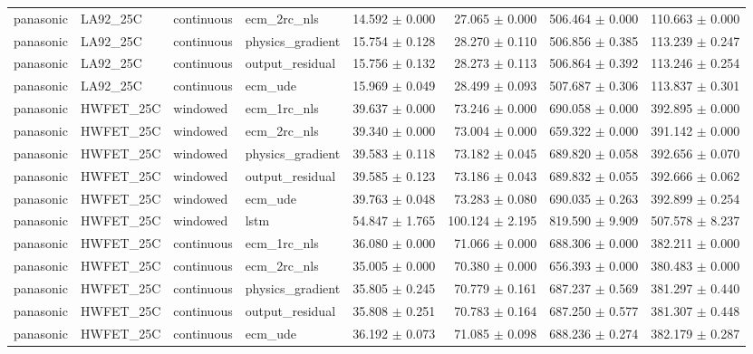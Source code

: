 \begin{longtable}{llllrrrr}
panasonic & LA92\_25C & continuous & ecm\_2rc\_nls & 14.592 $\pm$ 0.000 & 27.065 $\pm$ 0.000 & 506.464 $\pm$ 0.000 & 110.663 $\pm$ 0.000 \\
panasonic & LA92\_25C & continuous & physics\_gradient & 15.754 $\pm$ 0.128 & 28.270 $\pm$ 0.110 & 506.856 $\pm$ 0.385 & 113.239 $\pm$ 0.247 \\
panasonic & LA92\_25C & continuous & output\_residual & 15.756 $\pm$ 0.132 & 28.273 $\pm$ 0.113 & 506.864 $\pm$ 0.392 & 113.246 $\pm$ 0.254 \\
panasonic & LA92\_25C & continuous & ecm\_ude & 15.969 $\pm$ 0.049 & 28.499 $\pm$ 0.093 & 507.687 $\pm$ 0.306 & 113.837 $\pm$ 0.301 \\
panasonic & HWFET\_25C & windowed & ecm\_1rc\_nls & 39.637 $\pm$ 0.000 & 73.246 $\pm$ 0.000 & 690.058 $\pm$ 0.000 & 392.895 $\pm$ 0.000 \\
panasonic & HWFET\_25C & windowed & ecm\_2rc\_nls & 39.340 $\pm$ 0.000 & 73.004 $\pm$ 0.000 & 659.322 $\pm$ 0.000 & 391.142 $\pm$ 0.000 \\
panasonic & HWFET\_25C & windowed & physics\_gradient & 39.583 $\pm$ 0.118 & 73.182 $\pm$ 0.045 & 689.820 $\pm$ 0.058 & 392.656 $\pm$ 0.070 \\
panasonic & HWFET\_25C & windowed & output\_residual & 39.585 $\pm$ 0.123 & 73.186 $\pm$ 0.043 & 689.832 $\pm$ 0.055 & 392.666 $\pm$ 0.062 \\
panasonic & HWFET\_25C & windowed & ecm\_ude & 39.763 $\pm$ 0.048 & 73.283 $\pm$ 0.080 & 690.035 $\pm$ 0.263 & 392.899 $\pm$ 0.254 \\
panasonic & HWFET\_25C & windowed & lstm & 54.847 $\pm$ 1.765 & 100.124 $\pm$ 2.195 & 819.590 $\pm$ 9.909 & 507.578 $\pm$ 8.237 \\
panasonic & HWFET\_25C & continuous & ecm\_1rc\_nls & 36.080 $\pm$ 0.000 & 71.066 $\pm$ 0.000 & 688.306 $\pm$ 0.000 & 382.211 $\pm$ 0.000 \\
panasonic & HWFET\_25C & continuous & ecm\_2rc\_nls & 35.005 $\pm$ 0.000 & 70.380 $\pm$ 0.000 & 656.393 $\pm$ 0.000 & 380.483 $\pm$ 0.000 \\
panasonic & HWFET\_25C & continuous & physics\_gradient & 35.805 $\pm$ 0.245 & 70.779 $\pm$ 0.161 & 687.237 $\pm$ 0.569 & 381.297 $\pm$ 0.440 \\
panasonic & HWFET\_25C & continuous & output\_residual & 35.808 $\pm$ 0.251 & 70.783 $\pm$ 0.164 & 687.250 $\pm$ 0.577 & 381.307 $\pm$ 0.448 \\
panasonic & HWFET\_25C & continuous & ecm\_ude & 36.192 $\pm$ 0.073 & 71.085 $\pm$ 0.098 & 688.236 $\pm$ 0.274 & 382.179 $\pm$ 0.287 \\

\end{longtable}
